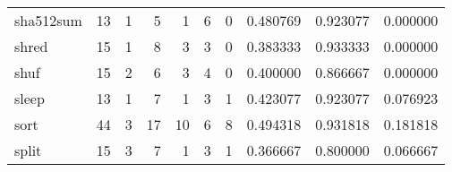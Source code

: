 \begin{longtable}{lrrrrrrrrr}
sha512sum &                                       13 &                                                  1 &                                                  5 &                                                  1 &                                                  6 &                                                  0 &                                           0.480769 &                               0.923077 &                             0.000000 \\
shred     &                                       15 &                                                  1 &                                                  8 &                                                  3 &                                                  3 &                                                  0 &                                           0.383333 &                               0.933333 &                             0.000000 \\
shuf      &                                       15 &                                                  2 &                                                  6 &                                                  3 &                                                  4 &                                                  0 &                                           0.400000 &                               0.866667 &                             0.000000 \\
sleep     &                                       13 &                                                  1 &                                                  7 &                                                  1 &                                                  3 &                                                  1 &                                           0.423077 &                               0.923077 &                             0.076923 \\
sort      &                                       44 &                                                  3 &                                                 17 &                                                 10 &                                                  6 &                                                  8 &                                           0.494318 &                               0.931818 &                             0.181818 \\
split     &                                       15 &                                                  3 &                                                  7 &                                                  1 &                                                  3 &                                                  1 &                                           0.366667 &                               0.800000 &                             0.066667 \\

\end{longtable}
